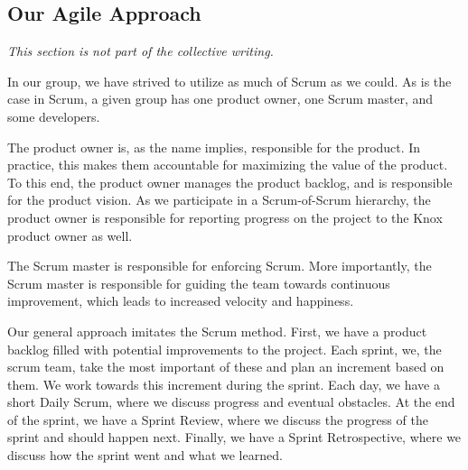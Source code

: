 \subsection{Our Agile Approach}\label{our_agile_approach}
\textit{This section is not part of the collective writing.}

In our group, we have strived to utilize as much of Scrum as we could.
As is the case in Scrum, a given group has one product owner, one Scrum master, and some developers.

The product owner is, as the name implies, responsible for the product. In practice, this makes them accountable for maximizing the value of the product. To this end, the product owner manages the product backlog, and is responsible for the product vision. As we participate in a Scrum-of-Scrum hierarchy, the product owner is responsible for reporting progress on the project to the Knox product owner as well.

The Scrum master is responsible for enforcing Scrum. More importantly, the Scrum master is responsible for guiding the team towards continuous improvement, which leads to increased velocity and happiness.

Our general approach imitates the Scrum method. First, we have a product backlog filled with potential improvements to the project. Each sprint, we, the scrum team, take the most important of these and plan an increment based on them. We work towards this increment during the sprint. Each day, we have a short Daily Scrum, where we discuss progress and eventual obstacles. At the end of the sprint, we have a Sprint Review, where we discuss the progress of the sprint and should happen next. Finally, we have a Sprint Retrospective, where we discuss how the sprint went and what we learned.